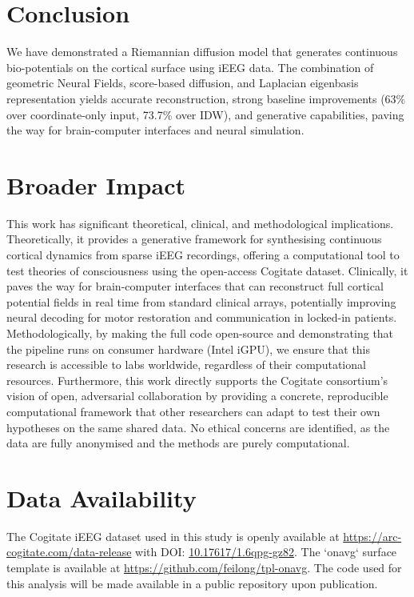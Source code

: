 \documentclass[twocolumn]{article}
\begin{document}
	\section{Conclusion}
	We have demonstrated a Riemannian diffusion model that generates continuous bio-potentials on the cortical surface using iEEG data. The combination of geometric Neural Fields, score-based diffusion, and Laplacian eigenbasis representation yields accurate reconstruction, strong baseline improvements (63\% over coordinate-only input, 73.7\% over IDW), and generative capabilities, paving the way for brain-computer interfaces and neural simulation.
	
	\section*{Broader Impact}
	This work has significant theoretical, clinical, and methodological implications. Theoretically, it provides a generative framework for synthesising continuous cortical dynamics from sparse iEEG recordings, offering a computational tool to test theories of consciousness using the open-access Cogitate dataset. Clinically, it paves the way for brain-computer interfaces that can reconstruct full cortical potential fields in real time from standard clinical arrays, potentially improving neural decoding for motor restoration and communication in locked-in patients. Methodologically, by making the full code open-source and demonstrating that the pipeline runs on consumer hardware (Intel iGPU), we ensure that this research is accessible to labs worldwide, regardless of their computational resources. Furthermore, this work directly supports the Cogitate consortium's vision of open, adversarial collaboration by providing a concrete, reproducible computational framework that other researchers can adapt to test their own hypotheses on the same shared data. No ethical concerns are identified, as the data are fully anonymised and the methods are purely computational.
	
	\section*{Data Availability}
	The Cogitate iEEG dataset used in this study is openly available at \url{https://arc-cogitate.com/data-release} with DOI: \href{https://doi.org/10.17617/1.6qpg-gz82}{10.17617/1.6qpg-gz82}. The `onavg` surface template is available at \url{https://github.com/feilong/tpl-onavg}. The code used for this analysis will be made available in a public repository upon publication.
	
\end{document}
